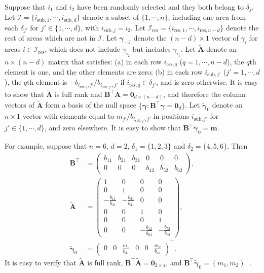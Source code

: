 \documentclass[12pt]{article}
\begin{document}
Suppose that $i_1$ and $i_2$ have been randomly selected and they both belong to $\delta_j$. Let $\mathcal{I}=\{i_{\text{sub},1},\cdots,i_{\text{sub},d}\}$ denote a subset of $\{1,\cdots,n\}$, including one area from each $\delta_{j'}$ for $j'\in\{1,\cdots,d\}$, with $i_{\text{sub},j}=i_2$.  Let $\mathcal{I}_{\text{res}}=\{i_{\text{res},1},\cdots,i_{\text{res},n-d}\}$ denote the rest of areas which are not in $\mathcal{I}$. Let $\bm{\gamma}_{-\mathcal{I}}$ denote the $(n-d)\times 1$ vector of $\gamma_i$ for areas $i\in \mathcal{I}_{\text{res}}$, which does not include $\gamma_{i_2}$ but includes $\gamma_{i_1}$.  Let $\widetilde{\bm{A}}$ denote an $n\times (n-d)$ matrix that satisfies: (a) in each row $i_{\text{res},q}$ ($q=1,\cdots,n-d$), the $q$th element is one, and the other elements are zero; (b) in each row $i_{\text{sub},j'}$ ($j'=1,\cdots,d$), the $q$th element is $-b_{i_{\text{res},q},j'}/b_{i_{\text{sub},j'},j'}$ if $i_{\text{res},q}\in \delta_{j'}$, and is zero otherwise.  It is easy to show that $\widetilde{\bm{A}}$ is full rank and $\bm{B}^{\top}\widetilde{\bm{A}}=\bm{0}_{d\times (n-d)}$, and therefore the column vectors of $\widetilde{\bm{A}}$ form a basis of the null space $\{\bm{\gamma}:\bm{B}^{\top}\bm{\gamma}=\bm{0}_d\}$. Let $\widetilde{\bm{\gamma}}_0$ denote an $n\times 1$ vector with elements equal to $m_{j'}/b_{i_{\text{sub},j'},j'}$ in positions $i_{\text{sub},j'}$ for $j'\in \{1,\cdots,d\}$, and zero elsewhere. It is easy to show that $\bm{B}^{\top}\widetilde{\bm{\gamma}}_0=\bm{m}$.

For example, suppose that $n=6$, $d=2$, $\delta_1=\{1,2,3\}$ and $\delta_2=\{4,5,6\}$.  Then
\begin{align*}
\bm{B}^{\top}&=\left(\begin{array}{cccccc} b_{11} & b_{21} & b_{31} & 0 & 0 &0\\ 0 & 0 & 0 & b_{42} & b_{52} & b_{62}\end{array}\right),\\
\widetilde{\bm{A}}&=\left(\begin{array}{cccc} 1 & 0 & 0 & 0\\ 0 & 1 & 0 & 0\\ -\frac{b_{11}}{b_{31}} & -\frac{b_{21}}{b_{31}} & 0 & 0\\
0 & 0 & 1 & 0\\ 0 & 0 & 0 &1\\ 0 & 0 & -\frac{b_{42}}{b_{62}} & -\frac{b_{52}}{b_{62}}\end{array}\right),\\
\widetilde{\bm{\gamma}}_0&=\left(\begin{array}{cccccc} 0 &0 &\frac{m_1}{b_{31}} &0 &0 & \frac{m_2}{b_{62}}\end{array}\right)^{\top}.
\end{align*}
It is easy to verify that $\widetilde{\bm{A}}$ is full rank, $\bm{B}^{\top}\widetilde{\bm{A}}=\bm{0}_{2\times 4}$, and $\bm{B}^{\top}\widetilde{\bm{\gamma}}_0=(m_1,m_2)^{\top}$.
\end{document}
